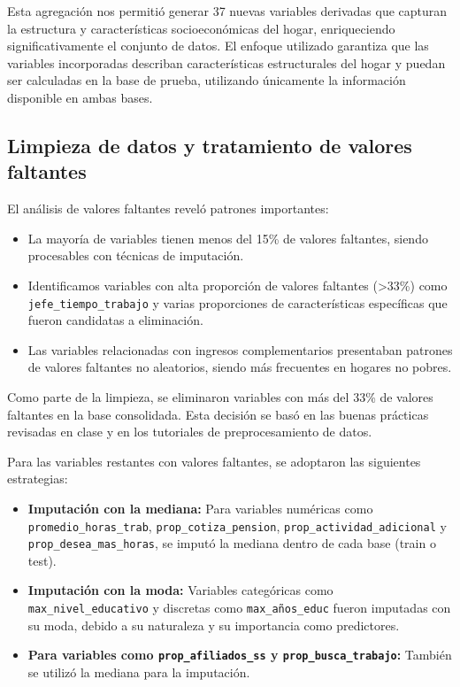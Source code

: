 \documentclass[12pt,a4paper,onecolumn]{article}
\begin{document}
Esta agregación nos permitió generar 37 nuevas variables derivadas que capturan la estructura y características socioeconómicas del hogar, enriqueciendo significativamente el conjunto de datos. El enfoque utilizado garantiza que las variables incorporadas describan características estructurales del hogar y puedan ser calculadas en la base de prueba, utilizando únicamente la información disponible en ambas bases.

\subsection{Limpieza de datos y tratamiento de valores faltantes}

El análisis de valores faltantes reveló patrones importantes:

\begin{itemize}
    \item La mayoría de variables tienen menos del 15\% de valores faltantes, siendo procesables con técnicas de imputación.
    \item Identificamos variables con alta proporción de valores faltantes (>33\%) como \texttt{jefe\_tiempo\_trabajo} y varias proporciones de características específicas que fueron candidatas a eliminación.
    \item Las variables relacionadas con ingresos complementarios presentaban patrones de valores faltantes no aleatorios, siendo más frecuentes en hogares no pobres.
\end{itemize}

Como parte de la limpieza, se eliminaron variables con más del 33\% de valores faltantes en la base consolidada. Esta decisión se basó en las buenas prácticas revisadas en clase y en los tutoriales de preprocesamiento de datos.

Para las variables restantes con valores faltantes, se adoptaron las siguientes estrategias:

\begin{itemize}
    \item \textbf{Imputación con la mediana:} Para variables numéricas como \texttt{promedio\_horas\_trab}, \texttt{prop\_cotiza\_pension}, \texttt{prop\_actividad\_adicional} y \texttt{prop\_desea\_mas\_horas}, se imputó la mediana dentro de cada base (train o test).
    \item \textbf{Imputación con la moda:} Variables categóricas como \texttt{max\_nivel\_educativo} y discretas como \texttt{max\_años\_educ} fueron imputadas con su moda, debido a su naturaleza y su importancia como predictores.
    \item \textbf{Para variables como \texttt{prop\_afiliados\_ss} y \texttt{prop\_busca\_trabajo}:} También se utilizó la mediana para la imputación.
\end{itemize}
\end{document}
